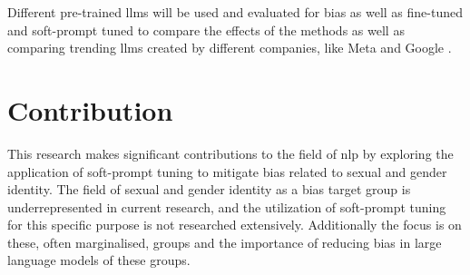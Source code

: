 Different pre-trained \acrshort{llms} will be used and evaluated for bias as well as fine-tuned and soft-prompt tuned to compare the effects of the methods as well as comparing trending \acrshort{llms} created by different companies, like Meta \citep{llama3} and Google \citep{gemma7}. 

\section{Contribution}
This research makes significant contributions to the field of \acrfull{nlp} by exploring the application of soft-prompt tuning to mitigate bias related to sexual and gender identity. The field of sexual and gender identity as a bias target group is underrepresented in current research, and the utilization of soft-prompt tuning for this specific purpose is not researched extensively. Additionally the focus is on these, often marginalised, groups and the importance of reducing bias in large language models of these groups. 


